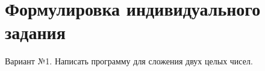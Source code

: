 \section{Формулировка индивидуального задания}

Вариант №1. Написать программу для сложения двух целых чисел.
